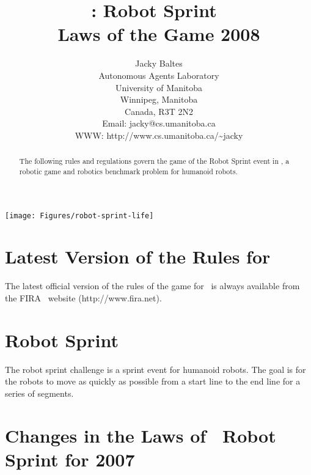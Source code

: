 \documentclass[12pt]{hurocup}
\begin{document}
\title{\HuroCup: Robot Sprint\ \\
  Laws of the Game 2008}

\author{Jacky Baltes\\
Autonomous Agents Laboratory\\
University of Manitoba\\
Winnipeg, Manitoba\\
Canada, R3T 2N2\\
Email: jacky@cs.umanitoba.ca\\
WWW: http://www.cs.umanitoba.ca/\~{ }jacky
}

\maketitle

\begin{center}
 \texttt{[image: Figures/robot-sprint-life]}
\end{center}

\begin{abstract}
The following rules and regulations govern the game of the Robot Sprint
event in \HuroCup, a robotic game and robotics benchmark problem for
humanoid robots.
%
\end{abstract}

\section*{Latest Version of the Rules for \HuroCup}
\label{sec:updates}

The latest official version of the rules of the game for \HuroCup\ is
always available from the FIRA \HuroCup\ website (http://www.fira.net).

\newpage

\section{Robot Sprint}
\label{sec:robot-sprint}

The robot sprint challenge is a sprint event for humanoid robots. The
goal is for the robots to move as quickly as possible from a start
line to the end line for a series of segments.

\section{Changes in the Laws of \HuroCup\ Robot Sprint for 2007}
\end{document}

